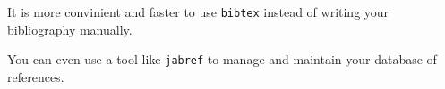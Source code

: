 \documentclass{icldt}\usepackage[]{graphicx}\usepackage[]{color}
\begin{document}




\begin{thebibliography}{123}
\raggedright

 It is more convinient and faster to use \texttt{bibtex} instead 
of writing your bibliography manually.

You can even use a tool like \texttt{jabref} to manage and maintain your 
database of references.

\end{thebibliography}
\end{document}
